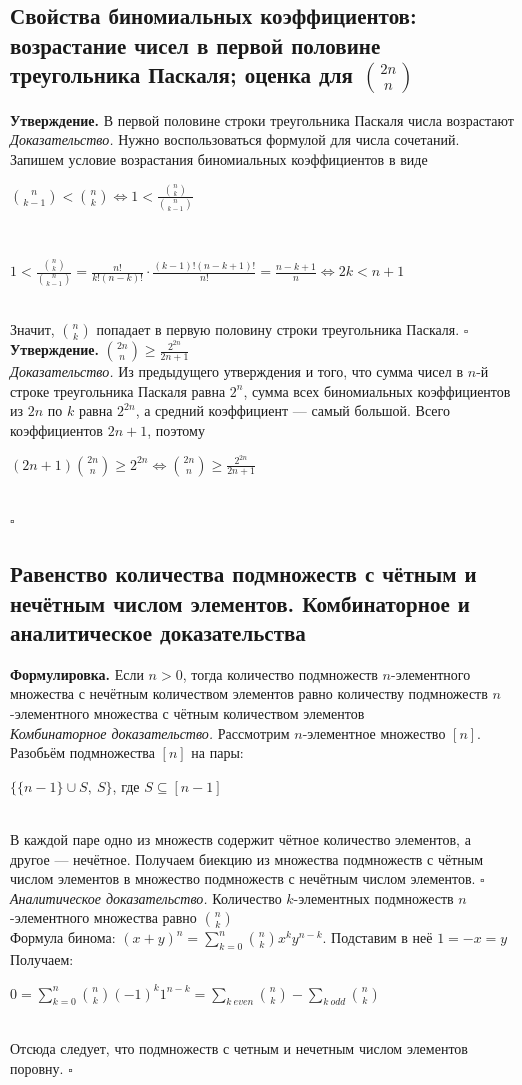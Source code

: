 \documentclass[a4paper]{article}
\newcommand{\qed}{\hfill$\square$}
\begin{document}
\subsection{Свойства биномиальных коэффициентов: возрастание чисел в первой половине треугольника Паскаля; оценка для $\binom{2n}{n}$}
\textbf{Утверждение.} В первой половине строки треугольника Паскаля числа возрастают\\[2mm]
\textit{Доказательство.} Нужно воспользоваться формулой для числа сочетаний. Запишем условие возрастания биномиальных коэффициентов в виде\\[2mm]
\centerline{$\binom{n}{k-1}<\binom{n}{k}\Leftrightarrow1<\frac{\binom{n}{k}}{\binom{n}{k-1}}$}\\[2mm]
\centerline{$1<\frac{\binom{n}{k}}{\binom{n}{k-1}}=\frac{n!}{k!(n-k)!}\cdot\frac{(k-1)!(n-k+1)!}{n!}=\frac{n-k+1}{n}\Leftrightarrow2k<n+1$}\\[2mm]
Значит, $\binom{n}{k}$ попадает в первую половину строки треугольника Паскаля. \qed\\[2mm]
\textbf{Утверждение.} $\binom{2n}{n}\geqslant\frac{2^{2n}}{2n+1}$\\[2mm]
\textit{Доказательство.} Из предыдущего утверждения и того, что сумма чисел в $n$-й строке треугольника Паскаля равна $2^n$, сумма всех биномиальных коэффициентов из $2n$ по $k$ равна $2^{2n}$, а средний коэффициент — самый большой. Всего коэффициентов $2n+1$, поэтому\\[2mm]
\centerline{$(2n+1)\binom{2n}{n}\geqslant2^{2n}\Leftrightarrow\binom{2n}{n}\geqslant\frac{2^{2n}}{2n+1}$}\\[2mm]
\qed
\subsection{Равенство количества подмножеств с чётным и нечётным числом элементов. Комбинаторное и аналитическое доказательства}
\textbf{Формулировка.} Если $n>0$, тогда количество подмножеств $n$-элементного множества с нечётным количеством элементов равно количеству подмножеств $n$-элементного множества с чётным количеством элементов\\[2mm]
\textit{Комбинаторное доказательство.} Рассмотрим $n$-элементное множество $[n]$. Разобьём подмножества $[n]$ на пары:\\[2mm]
\centerline{$\{\{n-1\}\cup S,\ S\}$, где $S\subseteq[n-1]$}\\[2mm]
\indent В каждой паре одно из множеств содержит чётное количество элементов, а другое — нечётное. Получаем биекцию из множества подмножеств с чётным числом элементов в множество подмножеств с нечётным числом элементов. \qed\\[2mm]
\textit{Аналитическое доказательство.} Количество $k$-элементных подмножеств $n$-элементного множества равно $\binom{n}{k}$\\[2mm]
Формула бинома: $(x+y)^n=\sum\limits_{k=0}^n \binom{n}{k}x^ky^{n-k}$. Подставим в неё $1=-x=y$\\[2mm]
Получаем:\\[2mm]
\centerline{$0=\sum\limits_{k=0}^n\binom{n}{k}(-1)^k1^{n-k}=\sum\limits_{k\ {even}}\binom{n}{k}-\sum\limits_{k\ {odd}} \binom{n}{k}$}\\[2mm]
Отсюда следует, что подмножеств с четным и нечетным числом элементов поровну. \qed
\end{document}
